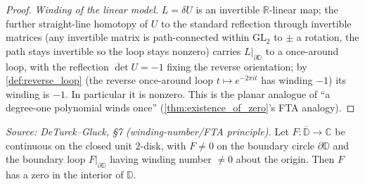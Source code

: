 \begin{proof}
  \emph{Winding of the linear model.} $L = \delta U$ is an invertible
  $\mathbb{R}$-linear map; the further straight-line homotopy of $U$ to the standard
  reflection through invertible matrices (any invertible matrix is path-connected
  within $\mathrm{GL}_2$ to $\pm$ a rotation, the path stays invertible so the loop
  stays nonzero) carries $L|_{\partial\mathbb{D}}$ to a once-around loop, with the
  reflection $\det U = -1$ fixing the reverse orientation; by \cref{def:reverse_loop}
  (the reverse once-around loop $t\mapsto e^{-2\pi i t}$ has winding $-1$) its winding
  is $-1$. In particular it is nonzero. This is
  the planar analogue of ``a degree-one polynomial winds once''
  (\cref{thm:existence_of_zero}'s FTA analogy).
\end{proof}

\begin{theorem}

  \label{thm:existence_of_zero}
  \textit{Source: DeTurck--Gluck, §7 (winding-number/FTA principle).}
  Let $F : \overline{\mathbb{D}} \to \mathbb{C}$ be continuous on the closed unit
  $2$-disk, with $F \ne 0$ on the boundary circle $\partial\mathbb{D}$ and the
  boundary loop $F|_{\partial\mathbb{D}}$ having winding number $\ne 0$ about the
  origin. Then $F$ has a zero in the interior of $\mathbb{D}$.
\end{theorem}
